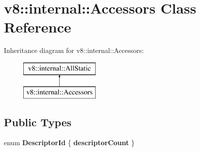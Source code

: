 \hypertarget{classv8_1_1internal_1_1_accessors}{}\section{v8\+:\+:internal\+:\+:Accessors Class Reference}
\label{classv8_1_1internal_1_1_accessors}
Inheritance diagram for v8\+:\+:internal\+:\+:Accessors\+:\begin{figure}[H]
\begin{center}
\leavevmode
\includegraphics[height=2.000000cm]{classv8_1_1internal_1_1_accessors}
\end{center}
\end{figure}
\subsection*{Public Types}
\begin{DoxyCompactItemize}
\item 
\hypertarget{classv8_1_1internal_1_1_accessors_a1c466e7b9e4df52b9cd44f01d41faf3b}{}enum {\bfseries Descriptor\+Id} \{ {\bfseries descriptor\+Count}
 \}\label{classv8_1_1internal_1_1_accessors_a1c466e7b9e4df52b9cd44f01d41faf3b}

\end{DoxyCompactItemize}
